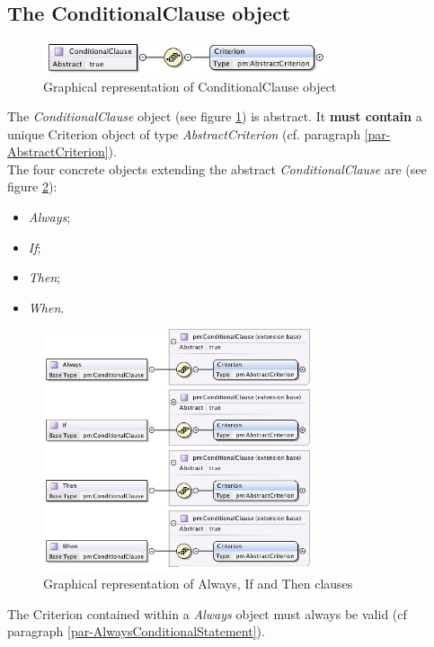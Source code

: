 \documentclass[a4paper,11pt] {ivoa}
\begin{document}
\subsection{The ConditionalClause object}\label{par-ConditionalClause}
\begin{figure}[htbp]
\begin{center}
\includegraphics[width=0.75\textwidth]{pictures/ConditionalClause.jpg} 
\caption{Graphical representation of ConditionalClause object}
\label{Pic-ConditionalClause}
\end{center}
\end{figure}
The {\it ConditionalClause} object (see figure \ref{Pic-ConditionalClause}) is abstract. It {\bf
must contain} a unique Criterion object of type {\it AbstractCriterion} (cf. paragraph
\ref{par-AbstractCriterion}).\\
The four concrete objects extending the abstract {\it ConditionalClause} are (see figure
\ref{Pic-ConcreteClause}):
\begin{itemize}
\item {\it Always};
\item {\it If};
\item {\it Then};
\item {\it When}.
\end{itemize}
\begin{figure}[htbp]
\begin{center}
\includegraphics[width=0.7\textwidth]{pictures/ConcreteClauses.jpg} 
\caption{Graphical representation of Always, If and Then clauses}
\label{Pic-ConcreteClause}
\end{center}
\end{figure}
The Criterion contained within a {\it Always} object must always be valid (cf paragraph
\ref{par-AlwaysConditionalStatement}).\\
\end{document}
